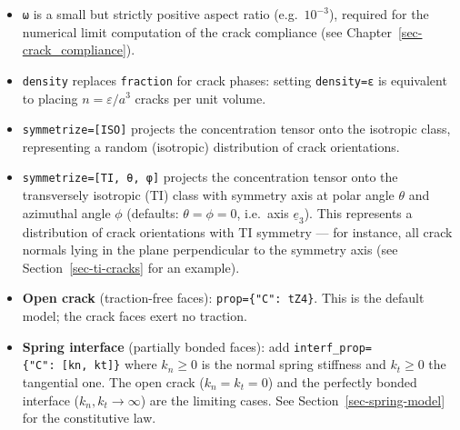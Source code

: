 \documentclass[
  a4paper,
  numbers=noendperiod,
  DIV=12]{scrreprt}
\providecommand{\tightlist}{%
  \setlength{\itemsep}{0pt}\setlength{\parskip}{0pt}}
\newcommand{\uv}[1]{{\underline{{#1}}}}
\begin{document}
\begin{itemize}
\tightlist
\item
  \texttt{ω} is a small but strictly positive aspect ratio
  (e.g.~\(10^{-3}\)), required for the numerical limit computation of
  the crack compliance (see Chapter~\ref{sec-crack_compliance}).
\item
  \texttt{density} replaces \texttt{fraction} for crack phases: setting
  \texttt{density=ε} is equivalent to placing \(n = \varepsilon / a^3\)
  cracks per unit volume.
\item
  \texttt{symmetrize={[}ISO{]}} projects the concentration tensor onto
  the isotropic class, representing a random (isotropic) distribution of
  crack orientations.
\item
  \texttt{symmetrize={[}TI,\ θ,\ φ{]}} projects the concentration tensor
  onto the transversely isotropic (TI) class with symmetry axis at polar
  angle \(\theta\) and azimuthal angle \(\phi\) (defaults:
  \(\theta=\phi=0\), i.e.~axis \(\uv{e}_3\)). This represents a
  distribution of crack orientations with TI symmetry --- for instance,
  all crack normals lying in the plane perpendicular to the symmetry
  axis (see Section~\ref{sec-ti-cracks} for an example).
\end{itemize}

\begin{tcolorbox}[enhanced jigsaw, arc=.35mm, bottomrule=.15mm, bottomtitle=1mm, breakable, colback=white, colbacktitle=quarto-callout-note-color!10!white, colframe=quarto-callout-note-color-frame, coltitle=black, left=2mm, leftrule=.75mm, opacityback=0, opacitybacktitle=0.6, rightrule=.15mm, title=\textcolor{quarto-callout-note-color}{\faInfo}\hspace{0.5em}{Open crack vs.~spring interface}, titlerule=0mm, toprule=.15mm, toptitle=1mm]

\begin{itemize}
\tightlist
\item
  \textbf{Open crack} (traction-free faces):
  \texttt{prop=\{"C":\ tZ4\}}. This is the default model; the crack
  faces exert no traction.
\item
  \textbf{Spring interface} (partially bonded faces): add
  \texttt{interf\_prop=\{"C":\ {[}kn,\ kt{]}\}} where \(k_n \geq 0\) is
  the normal spring stiffness and \(k_t \geq 0\) the tangential one. The
  open crack (\(k_n = k_t = 0\)) and the perfectly bonded interface
  (\(k_n, k_t \to \infty\)) are the limiting cases. See
  Section~\ref{sec-spring-model} for the constitutive law.
\end{itemize}

\end{tcolorbox}
\end{document}
